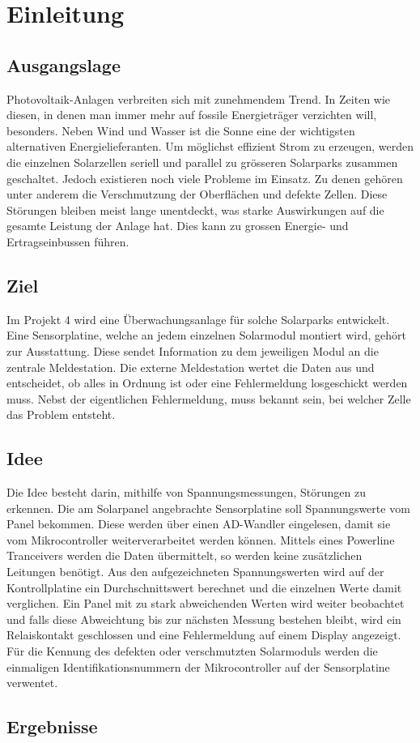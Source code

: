 \documentclass[a4paper]{fhnwreport} %
\begin{document}
\section{Einleitung}

\subsection{Ausgangslage}

Photovoltaik-Anlagen verbreiten sich mit zunehmendem Trend. In Zeiten wie diesen, in denen man immer mehr auf fossile Energieträger verzichten will, besonders. Neben Wind und Wasser ist die Sonne eine der wichtigsten alternativen Energielieferanten. Um möglichst effizient Strom zu erzeugen, werden die einzelnen Solarzellen seriell und parallel zu grösseren Solarparks zusammen geschaltet. Jedoch existieren noch viele Probleme im Einsatz. Zu denen gehören unter anderem die Verschmutzung der Oberflächen und defekte Zellen. Diese Störungen bleiben meist lange unentdeckt, was starke Auswirkungen auf die gesamte Leistung der Anlage hat. Dies kann zu grossen Energie- und Ertragseinbussen führen.

\subsection{Ziel}

Im Projekt 4 wird eine Überwachungsanlage für solche Solarparks entwickelt. Eine Sensorplatine, welche an jedem einzelnen Solarmodul montiert wird, gehört zur Ausstattung. Diese sendet Information zu dem jeweiligen Modul an die zentrale Meldestation. Die externe Meldestation wertet die Daten aus und entscheidet, ob alles in Ordnung ist oder eine Fehlermeldung losgeschickt werden muss. Nebst der eigentlichen Fehlermeldung, muss bekannt sein, bei welcher Zelle das Problem entsteht.

\subsection{Idee}

Die Idee besteht darin, mithilfe von Spannungsmessungen, Störungen zu erkennen. Die am Solarpanel angebrachte Sensorplatine soll  Spannungswerte vom Panel bekommen. Diese werden über einen AD-Wandler eingelesen, damit sie vom Mikrocontroller weiterverarbeitet werden können. Mittels eines Powerline Tranceivers werden die Daten übermittelt, so werden keine zusätzlichen Leitungen benötigt. Aus den aufgezeichneten Spannungswerten wird auf der Kontrollplatine ein Durchschnittswert berechnet und die einzelnen Werte damit verglichen. Ein Panel mit zu stark abweichenden Werten wird weiter beobachtet und falls diese Abweichtung bis zur nächsten Messung bestehen bleibt, wird ein Relaiskontakt geschlossen und eine Fehlermeldung auf einem Display angezeigt. Für die Kennung des defekten oder verschmutzten Solarmoduls  werden die einmaligen Identifikationsnummern der Mikrocontroller auf der Sensorplatine verwentet.

\subsection{Ergebnisse}
\end{document}

